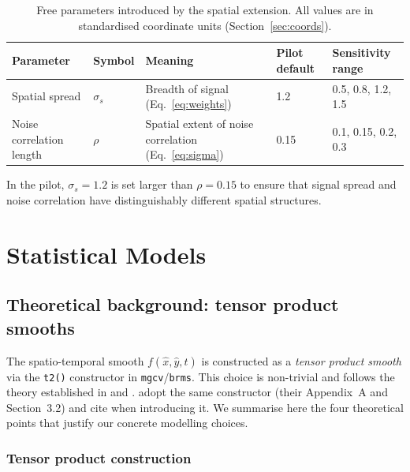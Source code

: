 \documentclass[12pt, a4paper]{article}
\begin{document}
\begin{table}[ht]
\centering
\caption{Free parameters introduced by the spatial extension.
All values are in standardised coordinate units
(Section~\ref{sec:coords}).}
\label{tab:free_params}
\small
\begin{tabular}{lllll}
\toprule
\textbf{Parameter} & \textbf{Symbol}
  & \textbf{Meaning}
  & \textbf{Pilot default}
  & \textbf{Sensitivity range} \\
\midrule
Spatial spread
  & $\sigma_s$
  & Breadth of signal (Eq.~\ref{eq:weights})
  & 1.2
  & 0.5, 0.8, 1.2, 1.5 \\
Noise correlation length
  & $\rho$
  & Spatial extent of noise correlation (Eq.~\ref{eq:sigma})
  & 0.15
  & 0.1, 0.15, 0.2, 0.3 \\
\bottomrule
\end{tabular}
\end{table}

In the pilot, $\sigma_s = 1.2$ is set larger than $\rho = 0.15$
to ensure that signal spread and noise correlation have distinguishably
different spatial structures.

\section{Statistical Models}\label{sec:models}

\subsection{Theoretical background: tensor product smooths}\label{sec:t2_theory}

The spatio-temporal smooth $f(\hat{x}, \hat{y}, t)$ is constructed as a
\emph{tensor product smooth} via the \texttt{t2()} constructor in
\texttt{mgcv}/\texttt{brms}.
This choice is non-trivial and follows the theory established in
\citet{Wood2006tensor, WoodScheiplFaraway2013} and \citet[Ch.~5]{Wood2017}.
\citet{Nalborczyk2025} adopt the same constructor (their Appendix~A and
Section~3.2) and cite \citet{Wood2017} when introducing it.
We summarise here the four theoretical points that justify our concrete
modelling choices.

\subsubsection{Tensor product construction}\label{sec:theory_tensor}
\end{document}
